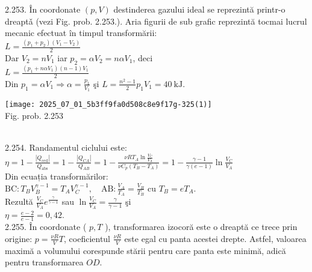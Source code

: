 2.253. În coordonate $(p, V)$ destinderea gazului ideal se reprezintă printr-o dreaptǎ (vezi Fig. prob. 2.253.). Aria figurii de sub grafic reprezintă tocmai lucrul mecanic efectuat în timpul transformării:\\ $L=\frac{\left(p_{1}+p_{2}\right)\left(V_{1}-V_{2}\right)}{2}$\\ Dar $V_{2}=n V_{1}$ iar $p_{2}=\alpha V_{2}=n \alpha V_{1}$, deci\\ $L=\frac{\left(p_{1}+n \alpha V_{1}\right)(n-1) V_{1}}{2}$\\ Din $p_{1}=\alpha V_{1} \Rightarrow \alpha=\frac{p_{1}}{V_{1}}$ şi $L=\frac{n^{2}-1}{2} p_{1} V_{1}=40 \mathrm{~kJ}$.\\ \begin{center} \texttt{[image: 2025\_07\_01\_5b3ff9fa0d508c8e9f17g-325(1)]}\\ Fig. prob. 2.253 \end{center}\\

2.254. Randamentul ciclului este:\\ $\eta=1-\frac{\left|Q_{\text{ced}}\right|}{Q_{\text{abs}}}=1-\frac{\left|Q_{C A}\right|}{Q_{A B}}=1-\frac{\nu R T_{A} \ln \frac{V_{C}}{V_{A}}}{\nu C_{p}\left(T_{B}-T_{A}\right)}=1-\frac{\gamma-1}{\gamma(e-1)} \ln \frac{V_{C}}{V_{A}}$\\ Din ecuația transformărilor:\\ $\mathrm{BC}: T_{B} V_{B}^{\gamma-1}=T_{A} V_{C}^{\gamma-1}, \quad \mathrm{AB}: \frac{V_{A}}{T_{A}}=\frac{V_{B}}{T_{B}} \text { cu } T_{B}=e T_{A}$.\\ Rezultă $\frac{V_{C}}{V_{A}} e^{\frac{\gamma}{\gamma-1}}$ sau $\ln \frac{V_{C}}{V_{A}}=\frac{\gamma}{\gamma-1}$ şi\\ $\eta=\frac{e-2}{e-1}=0,42$.\\

2.255. În coordonate ( $p, T$ ), transformarea izocoră este o dreaptă ce trece prin origine: $p=\frac{\nu R}{V} T$, coeficientul $\frac{\nu R}{V}$ este egal cu panta acestei drepte. Astfel, valoarea maximă a volumului corespunde stării pentru care panta este minimă, adică pentru transformarea $O D$.\\

